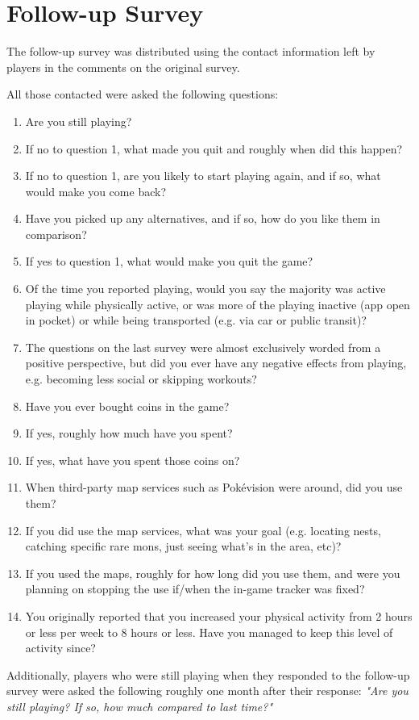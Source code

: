 \chapter{Follow-up Survey}
\label{appendix:follow-up}

The follow-up survey was distributed using the contact information left by players in the comments on the original survey.

All those contacted were asked the following questions:

\begin{enumerate}
\item Are you still playing?
\item If no to question 1, what made you quit and roughly when did this happen?
\item If no to question 1, are you likely to start playing again, and if so, what would make you come back?
\item Have you picked up any alternatives, and if so, how do you like them in comparison?
\item If yes to question 1, what would make you quit the game?
\item Of the time you reported playing, would you say the majority was active playing while physically active, or was more of the playing inactive (app open in pocket) or while being transported (e.g. via car or public transit)?
\item The questions on the last survey were almost exclusively worded from a positive perspective, but did you ever have any negative effects from playing, e.g. becoming less social or skipping workouts?
\item Have you ever bought coins in the game?
\item If yes, roughly how much have you spent?
\item If yes, what have you spent those coins on?
\item When third-party map services such as Pokévision were around, did you use them?
\item If you did use the map services, what was your goal (e.g. locating nests, catching specific rare mons, just seeing what's in the area, etc)?
\item If you used the maps, roughly for how long did you use them, and were you planning on stopping the use if/when the in-game tracker was fixed?
\item You originally reported that you increased your physical activity from 2 hours or less per week to 8 hours or less. Have you managed to keep this level of activity since?
\end{enumerate}

Additionally, players who were still playing when they responded to the follow-up survey were asked the following roughly one month after their response: \emph{"Are you still playing? If so, how much compared to last time?"}
